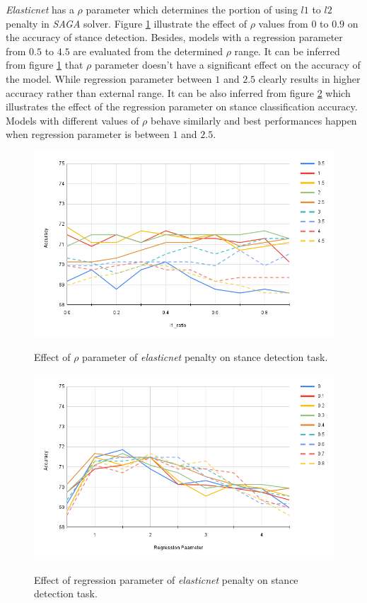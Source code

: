 \textit{Elasticnet} has a $\rho$ parameter which determines the portion of using $l1$ to $l2$ penalty in \textit{\ac{SAGA}} solver. Figure \ref{fig:logistic1} illustrate the effect of $\rho$ values from $0$ to $0.9$ on the accuracy of stance detection. Besides, models with a regression parameter from $0.5$ to $4.5$ are evaluated from the determined $\rho$ range. It can be inferred from figure \ref{fig:logistic1} that $\rho$ parameter doesn't have a significant effect on the accuracy of the model. While regression parameter between $1$ and $2.5$ clearly results in higher accuracy rather than external range. It can be also inferred from figure \ref{fig:logistic2} which illustrates the effect of the regression parameter on stance classification accuracy. Models with different values of $\rho$ behave similarly and best performances happen when regression parameter is between $1$ and $2.5$.  
\begin{figure}%
	\centering
	{\includegraphics[width=12.5cm]{statistics/logistic_elastic1.png} }
	\caption{Effect of $\rho$ parameter of \textit{elasticnet} penalty on stance detection task.}%
	\label{fig:logistic1}%
\end{figure}
\begin{figure}%
	\centering
	{\includegraphics[width=12.5cm]{statistics/logistic_elastic2.png} }
	\caption{Effect of regression parameter of \textit{elasticnet} penalty on stance detection task.}%
	\label{fig:logistic2}%
\end{figure}

